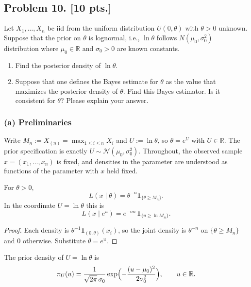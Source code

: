 \documentclass[11pt,a4paper]{article}
\begin{document}
\subsection{Problem 10. [10 pts.]}
Let \( X_1, \dots, X_n \) be iid from the uniform distribution \( U(0, \theta) \) with \( \theta > 0 \) unknown. Suppose that the prior on \( \theta \) is lognormal, i.e., \( \ln \theta \) follows \( N(\mu_0, \sigma_0^2) \) distribution where \( \mu_0 \in \mathbb{R} \) and \( \sigma_0 > 0 \) are known constants.
\begin{enumerate}[label=(\alph*)]
    \item Find the posterior density of \( \ln \theta \).
    \item Suppose that one defines the Bayes estimate for \( \theta \) as the value that maximizes the posterior density of \( \theta \). Find this Bayes estimator. Is it consistent for \( \theta \)? Please explain your answer.
\end{enumerate}

\setcounter{section}{10}
\setcounter{theorem}{0}
\setcounter{definition}{0}
\setcounter{remark}{0}
\setcounter{note}{0}

\subsubsection{(a) Preliminaries}

Write \(M_n:=X_{(n)}=\max_{1\le i\le n}X_i\) and \(U:=\ln\theta\), so \(\theta=e^U\) with \(U\in\mathbb{R}\). The prior specification is exactly \(U\sim\mathcal{N}(\mu_0,\sigma_0^2)\). Throughout, the observed sample \(x=(x_1,\dots,x_n)\) is fixed, and densities in the parameter are understood as functions of the parameter with \(x\) held fixed.

\begin{lemma}
\label{lem:p10a-lik}
For \(\theta>0\),
\[
L(x\mid\theta)
=
\theta^{-n}\mathbf{1}_{\{\theta\ge M_n\}}.
\]
In the coordinate \(U=\ln\theta\) this is
\[
L(x\mid e^u)
=
e^{-nu}\,\mathbf{1}_{\{u\ge\ln M_n\}}.
\]
\end{lemma}

\begin{proof}
Each density is \(\theta^{-1}\mathbf{1}_{(0,\theta)}(x_i)\), so the joint density is \(\theta^{-n}\) on \(\{\theta\ge M_n\}\) and \(0\) otherwise. Substitute \(\theta=e^u\).
\end{proof}

\begin{lemma}
\label{lem:p10a-prior}
The prior density of \(U=\ln\theta\) is
\[
\pi_U(u)
=
\frac{1}{\sqrt{2\pi}\,\sigma_0}
\exp\Bigl(-\frac{(u-\mu_0)^2}{2\sigma_0^2}\Bigr),
\qquad
u\in\mathbb{R}.
\]
\end{lemma}
\end{document}

